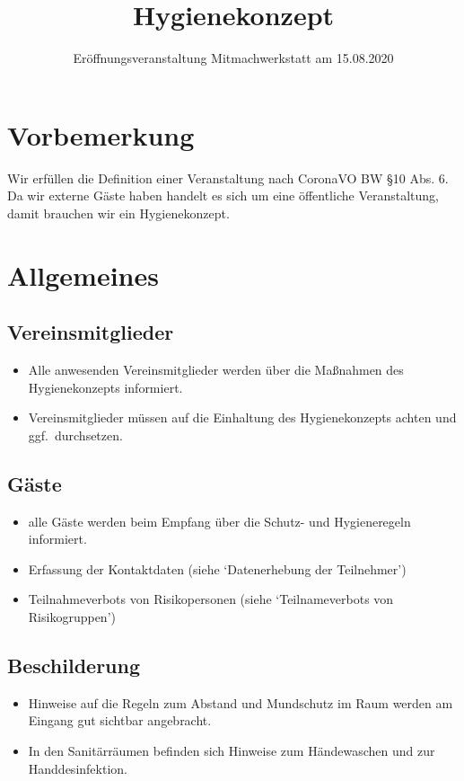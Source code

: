\documentclass[10pt,a4paper]{scrartcl}
\title{Hygienekonzept}
\subtitle{Eröffnungsveranstaltung Mitmachwerkstatt am 15.08.2020}
\date{\vspace{-8ex}}
\begin{document}
\maketitle
\section{Vorbemerkung}
Wir erfüllen die Definition einer Veranstaltung nach CoronaVO BW §10 Abs. 6.
Da wir externe Gäste haben handelt es sich um eine öffentliche Veranstaltung, damit brauchen wir ein Hygienekonzept.




\section{Allgemeines}
\subsection{Vereinsmitglieder}
\begin{itemize}
\item Alle anwesenden Vereinsmitglieder werden über die Maßnahmen des Hygienekonzepts informiert.
\item Vereinsmitglieder müssen auf die Einhaltung des Hygienekonzepts achten und ggf.\ durchsetzen.
\end{itemize}


\subsection{Gäste}
\begin{itemize}
\item alle Gäste werden beim Empfang über die Schutz- und Hygieneregeln informiert.
\item Erfassung der Kontaktdaten (siehe `Datenerhebung der Teilnehmer')
\item Teilnahmeverbots von Risikopersonen (siehe `Teilnameverbots von Risikogruppen')
\end{itemize}

\subsection{Beschilderung}
\begin{itemize}
\item Hinweise auf die Regeln zum Abstand und Mundschutz im Raum werden am Eingang gut sichtbar angebracht.
\item In den Sanitärräumen befinden sich Hinweise zum Händewaschen und zur Handdesinfektion.
\end{itemize}
\end{document}
